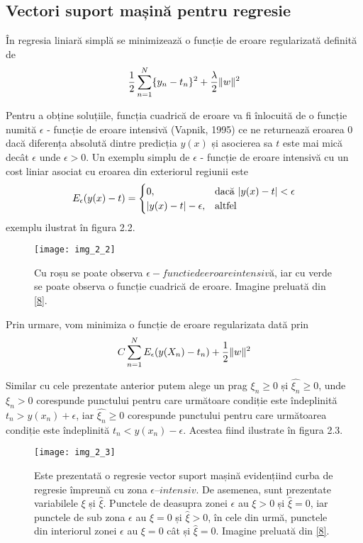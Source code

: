 \subsection{Vectori suport mașină pentru regresie}

În regresia liniară simplă se minimizează o funcție de eroare regularizată definită de
\begin{align}
	\frac{1}{2}\sum_{n=1}^{N}\{y_n-t_n\}^2+\frac{\lambda}{2}\lVert w\rVert^2
\end{align}

Pentru a obține soluțiile, funcția cuadrică de eroare va fi înlocuită de o funcție numită $\epsilon$ - funcție de eroare intensivă (Vapnik, 1995) ce ne returnează eroarea 0 dacă diferența absolută dintre predicția $y(x)$ și asocierea sa $t$ este mai mică decât $\epsilon$ unde $\epsilon > 0$. Un exemplu simplu de $\epsilon$ - funcție de eroare intensivă cu un cost liniar asociat cu eroarea din exteriorul regiunii este
\begin{align}
	E_{\epsilon}(y(x) - t) = 
	\begin{cases}
	0,& \text{dacă } \lvert y(x) - t\rvert < \epsilon\\
	\lvert y(x) - t\rvert - \epsilon,              & \text{altfel}
	\end{cases}
\end{align}
exemplu ilustrat în figura 2.2.
\begin{figure}[!h]
	\centering
	\texttt{[image: img\_2\_2]}
	\caption[Vector suport mașină regresie]{Cu roșu se poate observa $\epsilon - functie de eroare intensivă$, iar cu verde se poate observa o funcție cuadrică de eroare. Imagine preluată din \hyperlink{ChristopherBishop}{[8]}.}
\end{figure}
 
Prin urmare, vom minimiza o funcție de eroare regularizata dată prin
\begin{align}	
	C\sum_{n = 1}^{N}E_{\epsilon}(y(X_n) - t_n) + \frac{1}{2}\lVert w\rVert ^ 2
\end{align}

Similar cu cele prezentate anterior putem alege un prag $\xi_n \geq 0$ și $ \widehat{\xi_n} \geq 0$, unde $\xi_n > 0$ corespunde punctului pentru care următoare condiție este îndeplinită $t_n > y(x_n) + \epsilon$, iar  $ \widehat{\xi_n} \geq 0$ corespunde punctului pentru care următoarea condiție este îndeplinită $t_n < y(x_n) - \epsilon$. Acestea fiind ilustrate în figura 2.3.
\begin{figure}[!h]
	\centering
	\texttt{[image: img\_2\_3]}
	\caption[Vector suport mașină regresie 2]{Este prezentată o regresie vector suport mașină evidențiind curba de regresie împreună cu zona $\epsilon – intensiv$. De asemenea, sunt prezentate variabilele $\xi$ și $ \widehat{\xi}$. Punctele de deasupra zonei $\epsilon$ au $\xi > 0$ și $ \widehat{\xi} = 0$, iar punctele de sub zona $\epsilon$ au $\xi = 0$ și $ \widehat{\xi} > 0$, în cele din urmă, punctele din interiorul zonei $\epsilon$ au $\xi = 0$ cât și $ \widehat{\xi} = 0$. Imagine preluată din \hyperlink{ChristopherBishop}{[8]}.}
\end{figure}


